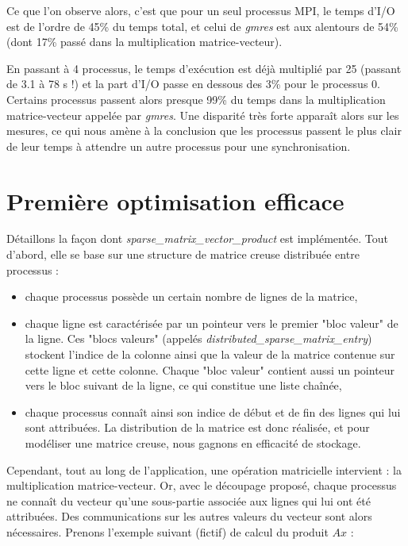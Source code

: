 \documentclass[11pt,a4paper,oneside]{memoir}
\theoremstyle{definition}
\theoremstyle{remark}
\theoremstyle{plain}
\begin{document}
Ce que l'on observe alors, c'est que pour un seul processus MPI, le temps d'I/O est de l'ordre de 45\% du temps total, et celui de \textit{gmres} est aux alentours de 54\% (dont 17\% passé dans la multiplication matrice-vecteur).

En passant à 4 processus, le temps d'exécution est déjà multiplié par 25 (passant de 3.1 à 78 s !) et la part d'I/O passe en dessous des 3\% pour le processus 0. Certains processus passent alors presque 99\% du temps dans la multiplication matrice-vecteur appelée par \textit{gmres}. Une disparité très forte apparaît alors sur les mesures, ce qui nous amène à la conclusion que les processus passent le plus clair de leur temps à attendre un autre processus pour une synchronisation.





\section{Première optimisation efficace}

Détaillons la façon dont \textit{sparse\_matrix\_vector\_product} est implémentée. Tout d'abord, elle se base sur une structure de matrice creuse distribuée entre processus :
\begin{itemize}
\item chaque processus possède un certain nombre de lignes de la matrice,
\item chaque ligne est caractérisée par un pointeur vers le premier "bloc valeur" de la ligne. Ces "blocs valeurs" (appelés \textit{distributed\_sparse\_matrix\_entry}) stockent l'indice de la colonne ainsi que la valeur de la matrice contenue sur cette ligne et cette colonne. Chaque "bloc valeur" contient aussi un pointeur vers le bloc suivant de la ligne, ce qui constitue une liste chaînée,
\item chaque processus connaît ainsi son indice de début et de fin des lignes qui lui sont attribuées. La distribution de la matrice est donc réalisée, et pour modéliser une matrice creuse, nous gagnons en efficacité de stockage.
\end{itemize}

Cependant, tout au long de l'application, une opération matricielle intervient : la multiplication matrice-vecteur. Or, avec le découpage proposé, chaque processus ne connaît du vecteur qu'une sous-partie associée aux lignes qui lui ont été attribuées. Des communications sur les autres valeurs du vecteur sont alors nécessaires. Prenons l'exemple suivant (fictif) de calcul du produit $Ax$ :
\end{document}
